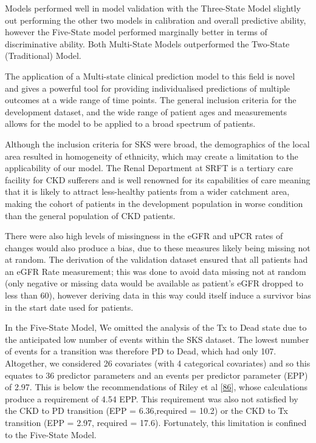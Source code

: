 \documentclass[12pt,PhD,twoside,openright]{muthesis}
\begin{document}
Models performed well in model validation with the Three-State Model slightly out performing the other two models in calibration and overall predictive ability, however the Five-State model performed marginally better in terms of discriminative ability. Both Multi-State Models outperformed the Two-State (Traditional) Model.

The application of a Multi-state clinical prediction model to this field is novel and gives a powerful tool for providing individualised predictions of multiple outcomes at a wide range of time points. The general inclusion criteria for the development dataset, and the wide range of patient ages and measurements allows for the model to be applied to a broad spectrum of patients.

Although the inclusion criteria for SKS were broad, the demographics of the local area resulted in homogeneity of ethnicity, which may create a limitation to the applicability of our model. The Renal Department at SRFT is a tertiary care facility for CKD sufferers and is well renowned for its capabilities of care meaning that it is likely to attract less-healthy patients from a wider catchment area, making the cohort of patients in the development population in worse condition than the general population of CKD patients.

There were also high levels of missingness in the eGFR and uPCR rates of changes would also produce a bias, due to these measures likely being missing not at random. The derivation of the validation dataset ensured that all patients had an eGFR Rate measurement; this was done to avoid data missing not at random (only negative or missing data would be available as patient's eGFR dropped to less than 60), however deriving data in this way could itself induce a survivor bias in the start date used for patients.

In the Five-State Model, We omitted the analysis of the Tx to Dead state due to the anticipated low number of events within the SKS dataset. The lowest number of events for a transition was therefore PD to Dead, which had only 107. Altogether, we considered 26 covariates (with 4 categorical covariates) and so this equates to 36 predictor parameters and an events per predictor parameter (EPP) of 2.97. This is below the recommendations of Riley et al {[}\protect\hyperlink{ref-riley_minimum_2019}{86}{]}, whose calculations produce a requirement of 4.54 EPP. This requirement was also not satisfied by the CKD to PD transition (EPP = 6.36,required = 10.2) or the CKD to Tx transition (EPP = 2.97, required = 17.6). Fortunately, this limitation is confined to the Five-State Model.
\end{document}
